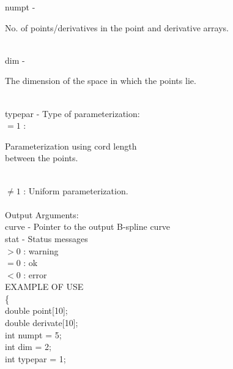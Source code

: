         \>\>    {\fov numpt}    \> - \> \begin{minipg2}
                                No. of points/derivatives in the
                                point and derivative arrays.
                                \end{minipg2}\\[0.3ex]
        \>\>    {\fov dim}      \> - \> \begin{minipg2}
                                The dimension of the space in which
                                the points lie.
                                \end{minipg2}\\
        \>\>    {\fov typepar}  \> - \>
                                Type of parameterization:\\
                \>\>\>\>\>      $=1$ : \>  \begin{minipg5}
                                Parameterization using cord length\\
                                between the points.
                                \end{minipg5}\\[0.3ex]
                \>\>\>\>\>      $\neq 1$ :\>  Uniform parameterization.\\
\\
        \>Output Arguments:\\
        \>\>    {\fov curve}    \> - \> Pointer to the output B-spline curve\\
        \>\>    {\fov stat}     \> - \> Status messages\\
                \>\>\>\>\>              $> 0$   : warning\\
                \>\>\>\>\>              $= 0$   : ok\\
                \>\>\>\>\>              $< 0$   : error\\
\newpagetabs
EXAMPLE OF USE\\
                \>      \{ \\
                \>\>    double  \>      {\fov point}[10];\\
                \>\>    double  \>      {\fov derivate}[10];\\
                \>\>    int     \>      {\fov numpt} = 5;\\
                \>\>    int     \>      {\fov dim} = 2;\\
                \>\>    int     \>      {\fov typepar} = 1;\\
